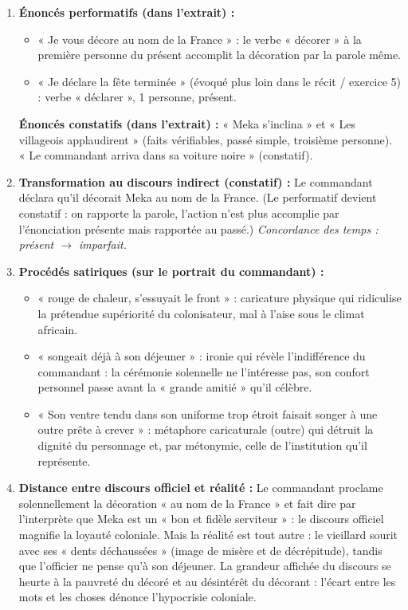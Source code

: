 \documentclass[11pt]{article}
\begin{document}
\begin{corrige}
\begin{enumerate}
\item \textbf{Énoncés performatifs (dans l'extrait) :}
\begin{itemize}
\item « Je vous décore au nom de la France » : le verbe « décorer » à la première personne du présent accomplit la décoration par la parole même.
\item « Je déclare la fête terminée » (évoqué plus loin dans le récit / exercice 5) : verbe « déclarer », 1\iere{} personne, présent.
\end{itemize}
\textbf{Énoncés constatifs (dans l'extrait) :} « Meka s'inclina » et « Les villageois applaudirent » (faits vérifiables, passé simple, troisième personne). « Le commandant arriva dans sa voiture noire » (constatif).
\item \textbf{Transformation au discours indirect (constatif) :} Le commandant déclara qu'il décorait Meka au nom de la France. (Le performatif devient constatif : on rapporte la parole, l'action n'est plus accomplie par l'énonciation présente mais rapportée au passé.) \emph{Concordance des temps : présent $\rightarrow$ imparfait.}
\item \textbf{Procédés satiriques (sur le portrait du commandant) :}
\begin{itemize}
\item « rouge de chaleur, s'essuyait le front » : caricature physique qui ridiculise la prétendue supériorité du colonisateur, mal à l'aise sous le climat africain.
\item « songeait déjà à son déjeuner » : ironie qui révèle l'indifférence du commandant : la cérémonie solennelle ne l'intéresse pas, son confort personnel passe avant la « grande amitié » qu'il célèbre.
\item « Son ventre tendu dans son uniforme trop étroit faisait songer à une outre prête à crever » : métaphore caricaturale (outre) qui détruit la dignité du personnage et, par métonymie, celle de l'institution qu'il représente.
\end{itemize}
\item \textbf{Distance entre discours officiel et réalité :} Le commandant proclame solennellement la décoration « au nom de la France » et fait dire par l'interprète que Meka est un « bon et fidèle serviteur » : le discours officiel magnifie la loyauté coloniale. Mais la réalité est tout autre : le vieillard sourit avec ses « dents déchaussées » (image de misère et de décrépitude), tandis que l'officier ne pense qu'à son déjeuner. La grandeur affichée du discours se heurte à la pauvreté du décoré et au désintérêt du décorant : l'écart entre les mots et les choses dénonce l'hypocrisie coloniale.

\end{enumerate}
\end{corrige}
\end{document}
